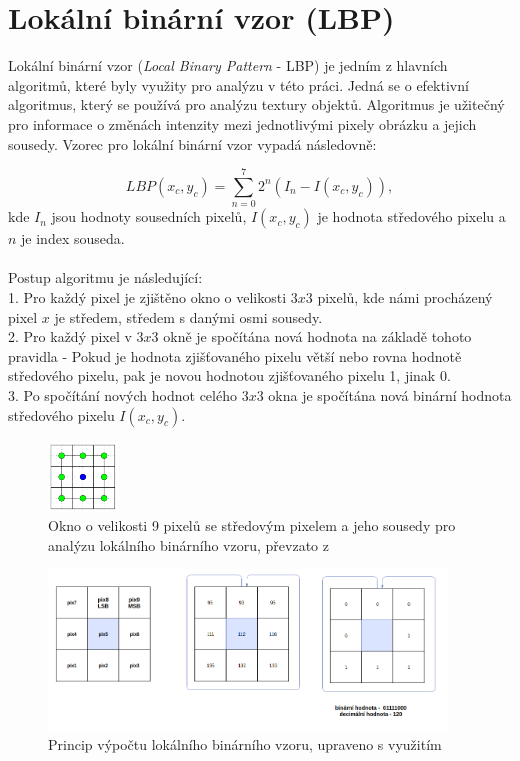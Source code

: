 \section{Lokální binární vzor (LBP)}
Lokální binární vzor (\textit{Local Binary Pattern} - LBP) je jedním z hlavních algoritmů, které byly využity pro analýzu v této práci. Jedná se o efektivní algoritmus, který se používá pro analýzu textury objektů.  Algoritmus je užitečný pro informace o změnách intenzity mezi jednotlivými pixely obrázku a jejich sousedy. Vzorec pro lokální binární vzor vypadá následovně:\cite{GaikwadStudy}

$$LBP(x_c,y_c) = \sum_{n=0}^{7}2^n(I_n-I(x_c,y_c)),$$
kde $I_n$ jsou hodnoty sousedních pixelů, $I(x_c,y_c)$ je hodnota středového pixelu a $n$ je index souseda.\\\\
Postup algoritmu je následující:\\
1. Pro každý pixel je zjištěno okno o velikosti $3x3$ pixelů, kde námi procházený pixel $x$ je středem, středem s danými osmi sousedy.\\
2. Pro každý pixel v $3x3$ okně je spočítána nová hodnota na základě tohoto pravidla - Pokud je hodnota zjišťovaného pixelu větší nebo rovna hodnotě středového pixelu, pak je novou hodnotou zjišťovaného pixelu 1, jinak 0.\\
3. Po spočítání nových hodnot celého $3x3$ okna je spočítána nová binární hodnota středového pixelu $I(x_c,y_c)$.\\

\begin{figure}[!htbp]
    \centering
    \includegraphics[width=70px]{obrazky-figures/lbpn.png}
    \caption{Okno o velikosti 9 pixelů se středovým pixelem a jeho sousedy pro analýzu lokálního binárního vzoru, převzato z \cite{GragnanielloStudy}}
\end{figure}

\begin{figure}[!htbp]
    \centering
    \includegraphics[width=400px]{obrazky-figures/lbpprincip.png}
    \caption{Princip výpočtu lokálního binárního vzoru, upraveno s využitím \cite{GaikwadStudy}}
\end{figure}

